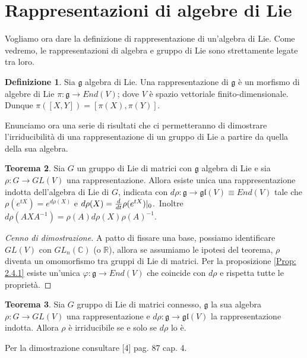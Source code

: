 \documentclass[12pt,a4paper]{report}
\theoremstyle{definition}
\newtheorem{Def}{Definizione}[chapter]
\theoremstyle{Theorem}
\newtheorem{Theo}[Def]{Teorema}
\theoremstyle{definition}
\theoremstyle{definition}
\theoremstyle{definition}
\begin{document}
\section{Rappresentazioni di algebre di Lie}
Vogliamo ora dare la definizione di rappresentazione di un'algebra di Lie. Come vedremo, le rappresentazioni di algebra e gruppo di Lie sono strettamente legate tra loro.
\begin{Def}
	Sia $\mathfrak{g}$ algebra di Lie. Una rappresentazione di $\mathfrak{g}$ è un morfismo di algebre di Lie $\pi:\mathfrak{g}\rightarrow End(V)$; dove $V$ è spazio vettoriale finito-dimensionale. Dunque $\pi([X,Y])=[\pi(X),\pi(Y)]$.
\end{Def}
\begin{comment}
Così come per i gruppi, anche per le algebre abbiamo l'equivalenza tra le nozioni di azioni e gruppi. Infatti, data una rappresentazione.
\end{comment}
Enunciamo ora una serie di risultati che ci permetteranno di dimostrare l'irriducibilità di una rappresentazione di un gruppo di Lie a partire da quella della sua algebra.
\begin{Theo}
	Sia $G$ un gruppo di Lie di matrici con $\mathfrak{g}$ algebra di Lie e sia $\rho:G\rightarrow GL(V)$ una rappresentazione. Allora esiste unica una rappresentazione indotta dell'algebra di Lie di $G$, indicata con $d\rho:\mathfrak{g}\rightarrow \mathfrak{gl}(V)\equiv End(V)$ tale che $\rho(e^{tX})=e^{d\rho(X)}$ e $d\rho(X)={d\over dt}\rho(e^{tX})|_0$.\
	Inoltre $d\rho(AXA^{-1})=\rho(A)d\rho(X)\rho(A)^{-1}$.	
\end{Theo}
\begin{proof} [Cenno di dimostrazione]
	A patto di fissare una base, possiamo identificare $GL(V)$ con $GL_n(\mathbb{C})$ (o $\mathbb{R}$), allora se assumiamo le ipotesi del teorema, $\rho$ diventa un omomorfismo tra gruppi di Lie di matrici. Per la proposizione \ref{Prop: 2.4.1} esiste un'unica $\varphi:\mathfrak{g}\rightarrow End(V)$ che coincide con $d\rho$ e rispetta tutte le proprietà.
\end{proof}
\begin{Theo}\label{Theo: 3.1}
	Sia $G$ gruppo di Lie di matrici connesso, $\mathfrak{g}$ la sua algebra $\rho:G\rightarrow GL(V)$ una rappresentazione e $d\rho:\mathfrak{g}\rightarrow \mathfrak{gl}(V)$ la rappresentazione indotta. Allora $\rho$ è irriducibile se e solo se $d\rho$ lo è.
\end{Theo}
Per la dimostrazione consultare [4] pag. 87 cap. 4.\\
\end{document}
